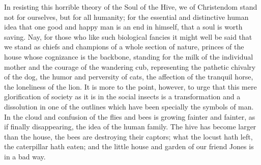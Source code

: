 \documentclass{book}
\begin{document}
In resisting this horrible theory of the Soul of the Hive, we of Christendom stand not for ourselves, but for all humanity; for the essential and distinctive human idea that one good and happy man is an end in himself, that a soul is worth saving. Nay, for those who like such biological fancies it might well be said that we stand as chiefs and champions of a whole section of nature, princes of the house whose cognizance is the backbone, standing for the milk of the individual mother and the courage of the wandering cub, representing the pathetic chivalry of the dog, the humor and perversity of cats, the affection of the tranquil horse, the loneliness of the lion. It is more to the point, however, to urge that this mere glorification of society as it is in the social insects is a transformation and a dissolution in one of the outlines which have been specially the symbols of man. In the cloud and confusion of the flies and bees is growing fainter and fainter, as if finally disappearing, the idea of the human family. The hive has become larger than the house, the bees are destroying their captors; what the locust hath left, the caterpillar hath eaten; and the little house and garden of our friend Jones is in a bad way.
\end{document}
